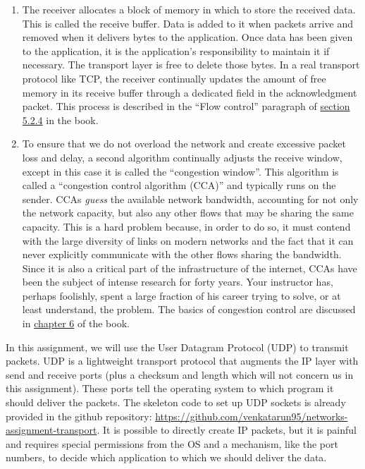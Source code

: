 \documentclass{article}
\begin{document}
\begin{enumerate}
\item The receiver allocates a block of memory in which to store the received data. This is called the receive buffer. Data is added to it when packets arrive and removed when it delivers bytes to the application. Once data has been given to the application, it is the application's responsibility to maintain it if necessary. The transport layer is free to delete those bytes. In a real transport protocol like TCP, the receiver continually updates the amount of free memory in its receive buffer through a dedicated field in the acknowledgment packet. This process is described in the ``Flow control'' paragraph of \href{https://book.systemsapproach.org/e2e/tcp.html\#sliding-window-revisited}{section 5.2.4} in the book.
\item To ensure that we do not overload the network and create excessive packet loss and delay, a second algorithm continually adjusts the receive window, except in this case it is called the ``congestion window''. This algorithm is called a ``congestion control algorithm (CCA)'' and typically runs on the sender. CCAs \emph{guess} the available network bandwidth, accounting for not only the network capacity, but also any other flows that may be sharing the same capacity. This is a hard problem because, in order to do so, it must contend with the large diversity of links on modern networks and the fact that it can never explicitly communicate with the other flows sharing the bandwidth. Since it is also a critical part of the infrastructure of the internet, CCAs have been the subject of intense research for forty years. Your instructor has, perhaps foolishly, spent a large fraction of his career trying to solve, or at least understand, the problem. The basics of congestion control are discussed in \href{https://book.systemsapproach.org/congestion.html}{chapter 6} of the book.
\end{enumerate}

In this assignment, we will use the User Datagram Protocol (UDP) to transmit packets. UDP is a lightweight transport protocol that augments the IP layer with send and receive ports (plus a checksum and length which will not concern us in this assignment). These ports tell the operating system to which program it should deliver the packets. The skeleton code to set up UDP sockets is already provided in the github repository: \url{https://github.com/venkatarun95/networks-assignment-transport}. It is possible to directly create IP packets, but it is painful and requires special permissions from the OS and a mechanism, like the port numbers, to decide which application to which we should deliver the data.
\end{document}
